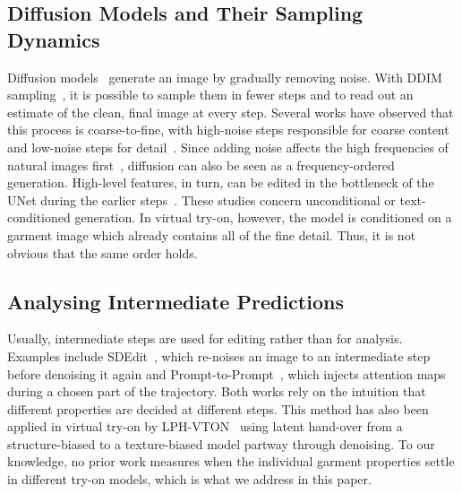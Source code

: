 \subsection{Diffusion Models and Their Sampling Dynamics}
Diffusion models~\cite{ho2020ddpm} generate an image by gradually removing noise. With DDIM sampling~\cite{song2021ddim}, it is possible to sample them in fewer steps and to read out an estimate of the clean, final image at every step. Several works have observed that this process is coarse-to-fine, with high-noise steps responsible for coarse content and low-noise steps for detail~\cite{choi2022p2}. Since adding noise affects the high frequencies of natural images first~\cite{rissanen2023ihdm,dieleman2024spectral}, diffusion can also be seen as a frequency-ordered generation. High-level features, in turn, can be edited in the bottleneck of the UNet during the earlier steps~\cite{kwon2023hspace}. These studies concern unconditional or text-conditioned generation. In virtual try-on, however, the model is conditioned on a garment image which already contains all of the fine detail. Thus, it is not obvious that the same order holds. 

\subsection{Analysing Intermediate Predictions}
Usually, intermediate steps are used for editing rather than for analysis. Examples include SDEdit~\cite{meng2022sdedit}, which re-noises an image to an intermediate step before denoising it again and Prompt-to-Prompt~\cite{hertz2023p2p}, which injects attention maps during a chosen part of the trajectory. Both works rely on the intuition that different properties are decided at different steps. This method has also been applied in virtual try-on by LPH-VTON~\cite{liu2026lphvton} using latent hand-over from a structure-biased to a texture-biased model partway through denoising. To our knowledge, no prior work measures when the individual garment properties settle in different try-on models, which is what we address in this paper.

